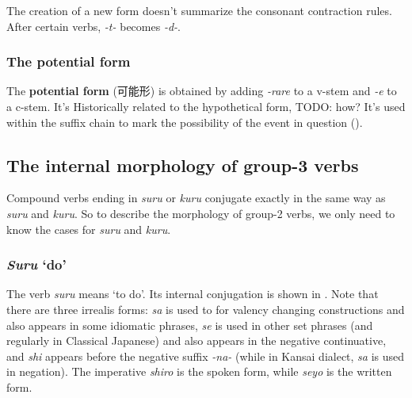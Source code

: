 \documentclass[UTF8, a4paper, oneside, scheme=plain]{ctexrep}
\newcommand*{\concept}[1]{\textbf{#1}}
\newcommand{\corpus}[1]{\emph{#1}}
\newcommand{\translate}[1]{`#1'}
\begin{document}
The creation of a new form doesn't summarize the consonant contraction rules.
After certain verbs, \corpus{-t-} becomes \corpus{-d-}.

\subsubsection{The potential form}\label{sec:potential-form}

The \concept{potential form} (可能形) is obtained by adding \corpus{-rare} to a v-stem 
and \corpus{-e} to a c-stem.
It's Historically related to the hypothetical form, TODO: how?
It's used within the suffix chain to mark the possibility of the event in question 
().

\subsection{The internal morphology of group-3 verbs}

Compound verbs ending in \corpus{suru} or \corpus{kuru} conjugate exactly in the same way as 
\corpus{suru} and \corpus{kuru}.
So to describe the morphology of group-2 verbs,
we only need to know the cases for \corpus{suru} and \corpus{kuru}.

\subsubsection{\corpus{Suru} \translate{do}}

The verb \corpus{suru} means \translate{to do}. Its internal conjugation is shown in .
Note that there are three irrealis forms:
\corpus{sa} is used to for valency changing constructions and also appears in some idiomatic phrases,
\corpus{se} is used in other set phrases (and regularly in Classical Japanese) 
and also appears in the negative continuative,
and \corpus{shi} appears before the negative suffix \corpus{-na-}
(while in Kansai dialect, \corpus{sa} is used in negation).
The imperative \corpus{shiro} is the spoken form,
while \corpus{seyo} is the written form.
\end{document}
